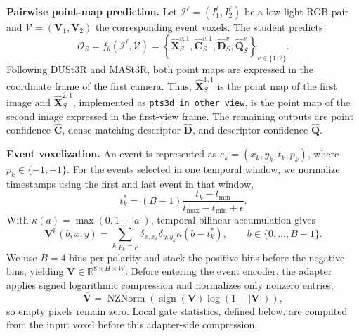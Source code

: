 \noindent\textbf{Pairwise point-map prediction.}
Let
$\mathcal{I}^{\ell}=(I_1^{\ell},I_2^{\ell})$ be a low-light RGB pair and
$\mathcal{V}=(\mathbf{V}_1,\mathbf{V}_2)$ the corresponding event voxels.
The student predicts
\begin{equation}
\mathcal{O}_{S}=f_{\theta}(\mathcal{I}^{\ell},\mathcal{V})
=\left\{
\hat{\mathbf{X}}_{S}^{v,1},
\hat{\mathbf{C}}_{S}^{v,1},
\hat{\mathbf{D}}_{S}^{v},
\hat{\mathbf{Q}}_{S}^{v}
\right\}_{v\in\{1,2\}}.
\label{eq:student_outputs}
\end{equation}
Following DUSt3R and MASt3R, both point maps are expressed in the coordinate
frame of the first camera.  Thus,
$\hat{\mathbf{X}}_{S}^{1,1}$ is the point map of the first image and
$\hat{\mathbf{X}}_{S}^{2,1}$, implemented as
\texttt{pts3d\_in\_other\_view}, is the point map of the second image expressed
in the first-view frame.  The remaining outputs are point confidence
$\hat{\mathbf{C}}$, dense matching descriptor $\hat{\mathbf{D}}$, and
descriptor confidence $\hat{\mathbf{Q}}$.

\vspace{+5pt}
\noindent\textbf{Event voxelization.}
An event is represented as
$e_k=(x_k,y_k,t_k,p_k)$, where $p_k\in\{-1,+1\}$.  For the events selected in
one temporal window, we normalize timestamps using the first and last event in
that window,
\begin{equation}
t_k^{*}
=(B-1)\frac{t_k-t_{\min}}{t_{\max}-t_{\min}+\epsilon}.
\label{eq:event_time_normalization}
\end{equation}
With $\kappa(a)=\max(0,1-|a|)$, temporal bilinear accumulation gives
\begin{equation}
\mathbf{V}^{p}(b,x,y)
=\sum_{k:p_k=p}
\delta_{x,x_k}\delta_{y,y_k}\kappa(b-t_k^{*}),
\qquad b\in\{0,\ldots,B-1\}.
\label{eq:event_voxelization}
\end{equation}
We use $B=4$ bins per polarity and stack the positive bins before the negative
bins, yielding
$\mathbf{V}\in\mathbb{R}^{8\times H\times W}$.  Before entering the event
encoder, the adapter applies signed logarithmic compression and normalizes only
nonzero entries,
\begin{equation}
\overline{\mathbf{V}}
=\operatorname{NZNorm}\!\left(
\operatorname{sign}(\mathbf{V})\log(1+|\mathbf{V}|)
\right),
\label{eq:event_voxel_normalization}
\end{equation}
so empty pixels remain zero.  Local gate statistics, defined below, are
computed from the input voxel before this adapter-side compression.

